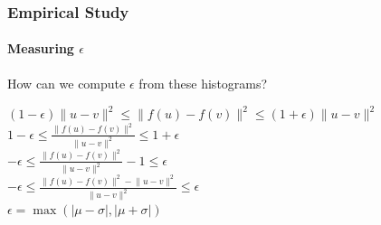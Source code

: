 \documentclass{beamer}
\begin{document}
\begin{frame}
\frametitle{Empirical Study}
\framesubtitle{Measuring $\epsilon$}

How can we compute $\epsilon$ from these histograms?
\medskip
\begin{center}
$(1-\epsilon)\lVert u-v \rVert^{2} \le \lVert f(u)-f(v) \rVert^{2}\le (1+\epsilon)\lVert u-v \rVert^{2}$\\
\medskip
$1-\epsilon \le \frac{\lVert f(u)-f(v) \rVert^{2}}{\lVert u-v \rVert^{2} }\le 1+\epsilon$\\
\medskip
$-\epsilon \le \frac{\lVert f(u)-f(v) \rVert^{2}}{\lVert u-v \rVert^{2}} - 1\le \epsilon$\\
\medskip
$-\epsilon \le \frac{\lVert f(u)-f(v) \rVert^{2}-\lVert u-v \rVert^{2}}{\lVert u-v \rVert^{2}}\le \epsilon$\\
\medskip
$\epsilon = \max(\lvert \mu - \sigma\rvert, \lvert \mu + \sigma\rvert)$\\
\end{center}


\end{frame}
\end{document}
